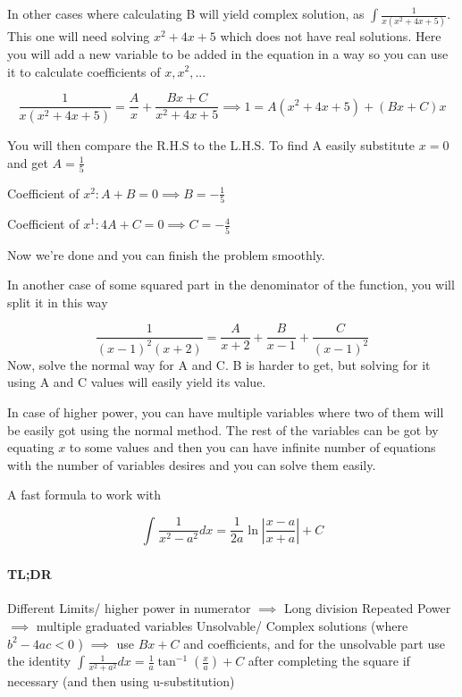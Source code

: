 \documentclass{article}
\begin{document}
	In other cases where calculating B will yield complex solution, as $ \int \frac{1}{x(x^2+4x+5)}$.
	This one will need solving $ x^2+4x+5 $ which does not have real solutions. Here you will add a new variable to be added in the equation in a way so you can use it to calculate coefficients of $ x, x^2, ... $

	\[	\frac{1}{x(x^2+4x+5)}= \frac{A}{x} + \frac{ Bx+C }{ x^2+4x+5 }  
	\implies 1 = A(x^2+4x+5) + (Bx+C)x
	\]

	You will then compare the R.H.S to the L.H.S. To find A easily substitute $ x=0 $ and get $ A = \frac{1}{5} $ 

	\begin{center}

		Coefficient of $ x^2: A+B = 0 \implies B = -\frac{1}{5}   $ 

		Coefficient of $ x^1: 4A+C = 0 \implies C = -\frac{4}{5} $ 

	\end{center}


	Now we're done and you can finish the problem smoothly.	



	In another case of some squared part in the denominator of the function, you will split it in this way

	\[
		\frac{1}{(x-1)^2(x+2)}  = \frac{A}{x+2} + \frac{B}{x-1} + \frac{C}{(x-1)^2}
	\]
	Now, solve the normal way for A and C. B is harder to get, but solving for it using A and C values will easily yield its value.

	In case of higher power, you can have multiple variables where two of them will be easily got using the normal method. The rest of the variables can be got by equating $x$ to some values and then you can have infinite number of equations with the number of variables desires and you can solve them easily. \newline

	A fast formula to work with 

	\[
		\int^{}_{} \frac{1}{x^2-a^2} dx =   \frac{1}{2a} \ln{ | \frac{ x-a }{ x+a }  |  } + C
	\]

	\paragraph{TL;DR}

	Different Limits/ higher power in numerator $ \implies $ Long division \newline 
	Repeated Power $ \implies $ multiple graduated variables\newline
	Unsolvable/ Complex solutions (where $ b^2 -4ac < 0 $ ) $ \implies $ use $ Bx+C $ and coefficients, and for the unsolvable part use the identity $ \int^{}_{} \frac{1}{x^2+a^2} dx = \frac{1}{a} \tan^{-1}(\frac{x}{a})+C  $ after completing the square if necessary (and then using u-substitution)\newline
\end{document}
